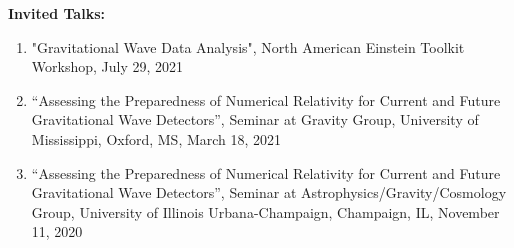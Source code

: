 \documentclass[11pt]{article}
\begin{document}
\begin{flushleft}
\vspace{8px}

\textbf{Invited Talks:}
  \begin{enumerate}
  \item "Gravitational Wave Data Analysis", North American Einstein Toolkit Workshop, July 29, 2021
  \item “Assessing the Preparedness of Numerical Relativity for Current and Future Gravitational Wave Detectors”, Seminar at Gravity Group, University of Mississippi, Oxford, MS, March 18, 2021
  \item “Assessing the Preparedness of Numerical Relativity for Current and Future Gravitational Wave Detectors”, Seminar at Astrophysics/Gravity/Cosmology Group, University of Illinois Urbana-Champaign, Champaign, IL, November 11, 2020
  \end{enumerate}


\end{flushleft}
\end{document}
